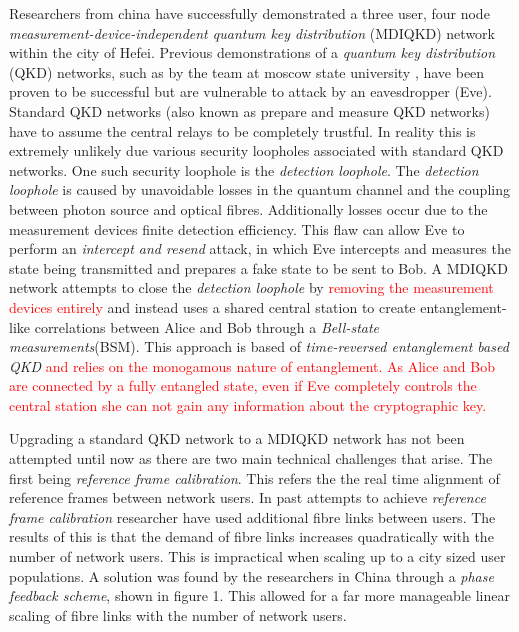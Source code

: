 \documentclass[journal]{vgtc}
\begin{document}
Researchers from china have successfully demonstrated a three user, four node \textit{measurement-device-independent quantum key distribution} (MDIQKD) network within the city of Hefei. Previous demonstrations of a \textit{quantum key distribution} (QKD) networks, such as by the team at moscow state university\cite{2017QuEle..47..798K} , have been proven to be successful but are vulnerable to attack by an eavesdropper (Eve). Standard QKD networks (also known as prepare and measure QKD networks) have to assume the central relays to be completely trustful. In reality this is extremely unlikely due various security loopholes associated with standard QKD networks. One such security loophole is the \textit{detection loophole}. The \textit{detection loophole} is caused by unavoidable losses in the quantum channel and  the coupling between photon source and optical fibres. Additionally losses occur due to the measurement devices finite detection efficiency. This flaw can allow Eve to perform an \textit{intercept and resend} attack, in which Eve intercepts and measures the state being transmitted and prepares a fake state to be sent to Bob. A MDIQKD network attempts to close the \textit{detection loophole} by \textcolor{red}{removing the measurement devices entirely} and instead uses a shared  central station to create entanglement-like correlations between Alice and Bob through a \textit{Bell-state measurements}(BSM). This approach is based of \textit{time-reversed entanglement based QKD}\cite{PhysRevA.54.2651} \textcolor{red}{and relies on the monogamous nature of entanglement. As Alice and Bob are connected by a fully entangled state, even if Eve completely controls the central station she can not gain any information about the cryptographic key.}

Upgrading a standard QKD network to a MDIQKD network has not been attempted until now as there are two main technical challenges that arise. The first being \textit{reference frame calibration}. This refers the the real time alignment of reference frames between network users. In past attempts to achieve \textit{reference frame calibration} researcher have used additional fibre links between users. The results of this is that the demand of fibre links increases quadratically with the number of network users. This is impractical when scaling up to a city sized user populations. A solution was found by the researchers in China through a \textit{phase feedback scheme}, shown in figure 1. This allowed for a far more manageable linear scaling of fibre links with the number of network users.
\end{document}
